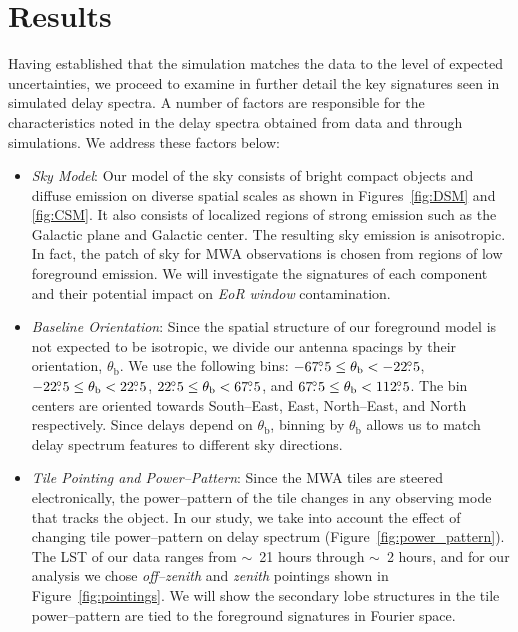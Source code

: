 \documentclass[preprint2,iop,numberedappendix]{emulateapj}
\begin{document}
\section{Results}\label{sec:delay-spectrum-analysis}

Having established that the simulation matches the data to the level of expected uncertainties, we proceed to examine in further detail the key signatures seen in simulated delay spectra. A number of factors are responsible for the characteristics noted in the delay spectra obtained from data and through simulations. We address these factors below: 

\begin{itemize}

\item {\it Sky Model}: Our model of the sky consists of bright compact objects and diffuse emission on diverse spatial scales as shown in Figures~\ref{fig:DSM} and \ref{fig:CSM}. It also consists of localized regions of strong emission such as the Galactic plane and Galactic center. The resulting sky emission is anisotropic. In fact, the patch of sky for MWA observations is chosen from regions of low foreground emission. We will investigate the signatures of each component and their potential impact on {\it EoR window} contamination.

\item {\it Baseline Orientation}: Since the spatial structure of our foreground model is not expected to be isotropic, we divide our antenna spacings by their orientation, $\theta_\textrm{b}$. We use the following bins: $-67\mbox{$.\!\!^\circ$} 5\le \theta_\textrm{b} < -22\mbox{$.\!\!^\circ$} 5$, $-22\mbox{$.\!\!^\circ$} 5\le \theta_\textrm{b} < 22\mbox{$.\!\!^\circ$} 5$, $22\mbox{$.\!\!^\circ$} 5\le \theta_\textrm{b} < 67\mbox{$.\!\!^\circ$} 5$, and $67\mbox{$.\!\!^\circ$} 5\le \theta_\textrm{b} < 112\mbox{$.\!\!^\circ$} 5$. The bin centers are oriented towards South--East, East, North--East, and North respectively. Since delays depend on $\theta_\textrm{b}$, binning by $\theta_\textrm{b}$ allows us to match delay spectrum features to different sky directions.

\item {\it Tile Pointing and Power--Pattern}: Since the MWA tiles are steered electronically, the power--pattern of the tile changes in any observing mode that tracks the object. In our study, we take into account the effect of changing tile power--pattern on delay spectrum (Figure~\ref{fig:power_pattern}). The LST of our data ranges from $\sim$~21 hours through $\sim$~2 hours, and for our analysis we chose {\it off--zenith} and {\it zenith} pointings shown in Figure~\ref{fig:pointings}. We will show the secondary lobe structures in the tile power--pattern are tied to the foreground signatures in Fourier space. 


\end{itemize}
\end{document}
